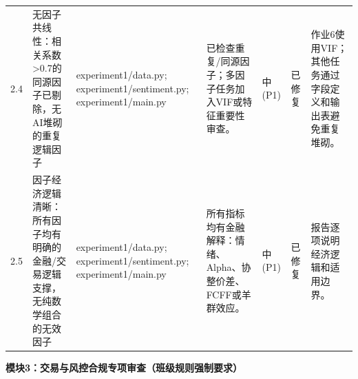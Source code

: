 \begin{longtable}{@{}L{0.045\textwidth}L{0.190\textwidth}L{0.140\textwidth}L{0.190\textwidth}L{0.060\textwidth}L{0.060\textwidth}L{0.205\textwidth}@{}}
2.4 & 无因子共线性：相关系数\textgreater0.7的同源因子已剔除，无AI堆砌的重复逻辑因子 & experiment1/\allowbreak{}data.py;\allowbreak{} experiment1/\allowbreak{}sentiment.py;\allowbreak{} experiment1/\allowbreak{}main.py & 已检查重复/\allowbreak{}同源因子；多因子任务加入VIF或特征重要性审查。 & 中(P1) & 已修复 & 作业6使用VIF；其他任务通过字段定义和输出表避免重复堆砌。 \\
2.5 & 因子经济逻辑清晰：所有因子均有明确的金融/\allowbreak{}交易逻辑支撑，无纯数学组合的无效因子 & experiment1/\allowbreak{}data.py;\allowbreak{} experiment1/\allowbreak{}sentiment.py;\allowbreak{} experiment1/\allowbreak{}main.py & 所有指标均有金融解释：情绪、Alpha、协整价差、FCFF或羊群效应。 & 中(P1) & 已修复 & 报告逐项说明经济逻辑和适用边界。 \\
\end{longtable}
\endgroup

\textbf{模块3：交易与风控合规专项审查（班级规则强制要求）}

